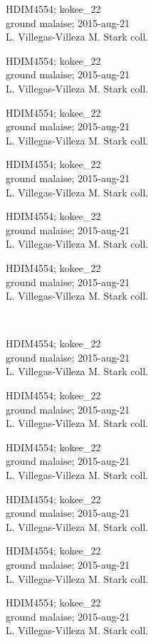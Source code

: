\documentclass[2pt]{extarticle}
\begin{document}
\noindent
\parbox{0.16\textwidth}{\tiny \raggedright \rule[-0.3\baselineskip]{0pt}{10pt}HDIM4554; kokee\_22\\ ground malaise; 2015-aug-21\\ L. Villegas-Villeza M. Stark coll.}
\parbox{0.16\textwidth}{\tiny \raggedright \rule[-0.3\baselineskip]{0pt}{10pt}HDIM4554; kokee\_22\\ ground malaise; 2015-aug-21\\ L. Villegas-Villeza M. Stark coll.}
\parbox{0.16\textwidth}{\tiny \raggedright \rule[-0.3\baselineskip]{0pt}{10pt}HDIM4554; kokee\_22\\ ground malaise; 2015-aug-21\\ L. Villegas-Villeza M. Stark coll.}
\parbox{0.16\textwidth}{\tiny \raggedright \rule[-0.3\baselineskip]{0pt}{10pt}HDIM4554; kokee\_22\\ ground malaise; 2015-aug-21\\ L. Villegas-Villeza M. Stark coll.}
\parbox{0.16\textwidth}{\tiny \raggedright \rule[-0.3\baselineskip]{0pt}{10pt}HDIM4554; kokee\_22\\ ground malaise; 2015-aug-21\\ L. Villegas-Villeza M. Stark coll.}
\parbox{0.16\textwidth}{\tiny \raggedright \rule[-0.3\baselineskip]{0pt}{10pt}HDIM4554; kokee\_22\\ ground malaise; 2015-aug-21\\ L. Villegas-Villeza M. Stark coll.} \\ 
\vspace{0.001in} 

\noindent
\parbox{0.16\textwidth}{\tiny \raggedright \rule[-0.3\baselineskip]{0pt}{10pt}HDIM4554; kokee\_22\\ ground malaise; 2015-aug-21\\ L. Villegas-Villeza M. Stark coll.}
\parbox{0.16\textwidth}{\tiny \raggedright \rule[-0.3\baselineskip]{0pt}{10pt}HDIM4554; kokee\_22\\ ground malaise; 2015-aug-21\\ L. Villegas-Villeza M. Stark coll.}
\parbox{0.16\textwidth}{\tiny \raggedright \rule[-0.3\baselineskip]{0pt}{10pt}HDIM4554; kokee\_22\\ ground malaise; 2015-aug-21\\ L. Villegas-Villeza M. Stark coll.}
\parbox{0.16\textwidth}{\tiny \raggedright \rule[-0.3\baselineskip]{0pt}{10pt}HDIM4554; kokee\_22\\ ground malaise; 2015-aug-21\\ L. Villegas-Villeza M. Stark coll.}
\parbox{0.16\textwidth}{\tiny \raggedright \rule[-0.3\baselineskip]{0pt}{10pt}HDIM4554; kokee\_22\\ ground malaise; 2015-aug-21\\ L. Villegas-Villeza M. Stark coll.}
\parbox{0.16\textwidth}{\tiny \raggedright \rule[-0.3\baselineskip]{0pt}{10pt}HDIM4554; kokee\_22\\ ground malaise; 2015-aug-21\\ L. Villegas-Villeza M. Stark coll.} \\ 
\vspace{0.001in} 
\end{document}
